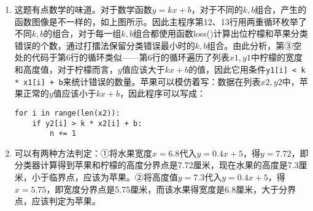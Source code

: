 \begin{enumerate}
\begin{enumerate}[label=$(\arabic*)$]
	\item 这题有点数学的味道。对于数学函数$y = kx + b$，对于不同的$k,b$组合，产生的函数图像是不一样的，如上图所示。因此主程序第12、13行用两重循环枚举了不同$k,b$的组合，对于每一组$k,b$组合都使用函数loss()计算出位柠檬和苹果分类错误的个数，通过打擂法保留分类错误最小时的$k,b$组合。由此分析，第③空处的代码于第6行的循环类似——第6行的循环遍历了列表$x1, y1$中柠檬的宽度和高度值，对于柠檬而言，$y$值应该大于$kx+b$的值，因此它用条件\lstinline|y1[i] < k * x1[i] + b|来统计错误的数量。苹果可以模仿着写：数据在列表$x2, y2$中，苹果正常的$y$值应该小于$kx+b$，因此程序可以写成：
\begin{lstlisting}[frame=none]
for i in range(len(x2)):
    if y2[i] > k * x2[i] + b:
        n += 1
\end{lstlisting}
	\item 可以有两种方法判定：①将水果宽度$x=6.8$代入$y=0.4x+5$，得$y=7.72$，即分类器计算得到苹果和柠檬的高度分界点是7.72厘米，现在水果的高度是7.3厘米，小于临界点，应该为苹果。②将高度值$y=7.3$代入$y=0.4x+5$，得$x=5.75$，即宽度分界点是5.75厘米，而该水果得宽度是6.8厘米，大于分界点，应该判定为苹果。
	\end{enumerate}









\end{enumerate}


\newpage
